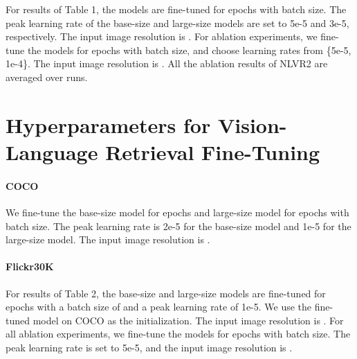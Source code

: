 \documentclass{article}
\begin{document}
For results of Table 1, the models are fine-tuned for  epochs with  batch size.
The peak learning rate of the base-size and large-size models are set to 5e-5 and 3e-5, respectively.
The input image resolution is .
For ablation experiments, we fine-tune the models for  epochs with  batch size, and choose learning rates from \{5e-5, 1e-4\}.
The input image resolution is . All the ablation results of NLVR2 are averaged over  runs.



\section{Hyperparameters for Vision-Language Retrieval Fine-Tuning}
\label{app:finetune:retrieval}

\paragraph{COCO}

We fine-tune the base-size model for  epochs and large-size model for  epochs with  batch size.
The peak learning rate is 2e-5 for the base-size model and 1e-5 for the large-size model.
The input image resolution is .


\paragraph{Flickr30K}

For results of Table 2, the base-size and large-size models are fine-tuned for  epochs with a batch size of  and a peak learning rate of 1e-5. We use the fine-tuned model on COCO as the initialization. The input image resolution is .
For all ablation experiments, we fine-tune the models for  epochs with  batch size.
The peak learning rate is set to 5e-5, and the input image resolution is .
\end{document}
